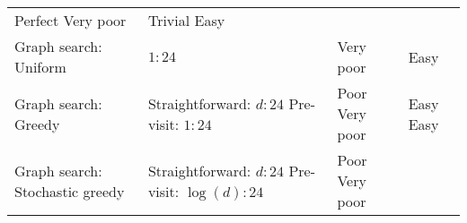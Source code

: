 \documentclass[10pt,oneside]{memoir}
\begin{document}
\begin{longtable}[]{@{}llll@{}}
\begin{minipage}[t]{0.12\columnwidth}
Perfect \linebreak Very poor\strut
\end{minipage} & \begin{minipage}[t]{0.14\columnwidth}\raggedright
Trivial \linebreak Easy\strut
\end{minipage}\tabularnewline
\begin{minipage}[t]{0.25\columnwidth}\raggedright
Graph search: Uniform\strut
\end{minipage} & \begin{minipage}[t]{0.37\columnwidth}\raggedright
\(1 : 24\)\strut
\end{minipage} & \begin{minipage}[t]{0.12\columnwidth}\raggedright
Very poor\strut
\end{minipage} & \begin{minipage}[t]{0.14\columnwidth}\raggedright
Easy\strut
\end{minipage}\tabularnewline
\begin{minipage}[t]{0.25\columnwidth}\raggedright
Graph search: Greedy\strut
\end{minipage} & \begin{minipage}[t]{0.37\columnwidth}\raggedright
Straightforward: \(d : 24\) \linebreak Pre-visit: \(1:24\)\strut
\end{minipage} & \begin{minipage}[t]{0.12\columnwidth}\raggedright
Poor \linebreak Very poor\strut
\end{minipage} & \begin{minipage}[t]{0.14\columnwidth}\raggedright
Easy \linebreak Easy\strut
\end{minipage}\tabularnewline
\begin{minipage}[t]{0.25\columnwidth}\raggedright
Graph search: Stochastic greedy\strut
\end{minipage} & \begin{minipage}[t]{0.37\columnwidth}\raggedright
Straightforward: \(d : 24\) \linebreak Pre-visit: \(\log(d) : 24\)\strut
\end{minipage} & \begin{minipage}[t]{0.12\columnwidth}\raggedright
Poor \linebreak Very poor\strut
\end{minipage} & \begin{minipage}[t]{0.14\columnwidth}\raggedright

\end{minipage}
\end{longtable}
\end{document}
